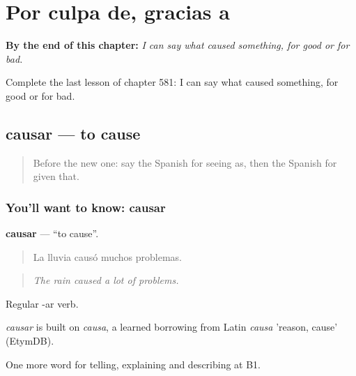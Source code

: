 
\chapter{Por culpa de, gracias a}
\label{ch:es-por-culpa-de-gracias-a}

\begin{chapteropening}
\textbf{By the end of this chapter:} \emph{I can say what caused something, for good or for bad.}

Complete the last lesson of chapter 581: I can say what caused something, for good or for bad.
\end{chapteropening}

\section[causar]{causar — to cause}

\label{lesson:ES-C581-causar}



\begin{quote}
Before the new one: say the Spanish for seeing as, then the Spanish for given that.
\end{quote}

\subsection*{You'll want to know: causar}
\textbf{causar} — \textquotedblleft{}to cause\textquotedblright{}.

\begin{quote}
La lluvia causó muchos problemas.
\end{quote}

\begin{quote}
\emph{The rain caused a lot of problems.}
\end{quote}

Regular -ar verb.

\begin{cousinweb}
\emph{causar} is built on \emph{causa}, a learned borrowing from Latin \emph{causa} 'reason, cause' (EtymDB).
\end{cousinweb}

\begin{grammarlens}[title={What you've built}]
One more word for telling, explaining and describing at B1.
\end{grammarlens}

